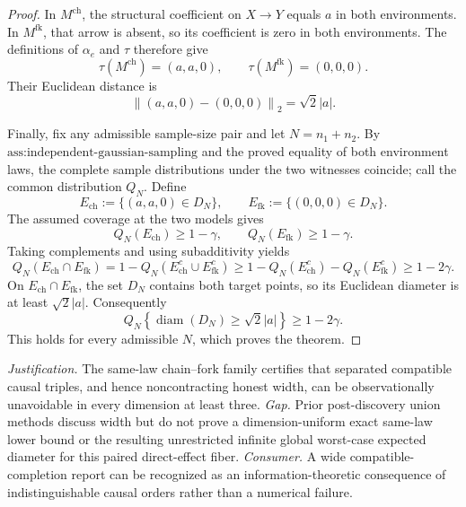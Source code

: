 \documentclass{article}
\begin{document}
\begin{proof}
In \(M^{\mathrm{ch}}\), the structural coefficient on \(X\to Y\) equals \(a\) in both environments. In \(M^{\mathrm{fk}}\), that arrow is absent, so its coefficient is zero in both environments. The definitions of \(\alpha_e\) and \(\tau\) therefore give
\[
 \tau(M^{\mathrm{ch}})=(a,a,0),
 \qquad
 \tau(M^{\mathrm{fk}})=(0,0,0).
\]
Their Euclidean distance is
\[
 \left\|(a,a,0)-(0,0,0)\right\|_2=\sqrt2\lvert a\rvert.
\]

Finally, fix any admissible sample-size pair and let \(N=n_1+n_2\). By \(\text{ass:independent-gaussian-sampling}\) and the proved equality of both environment laws, the complete sample distributions under the two witnesses coincide; call the common distribution \(Q_N\). Define
\[
 E_{\mathrm{ch}}:=\{(a,a,0)\in D_N\},
 \qquad
 E_{\mathrm{fk}}:=\{(0,0,0)\in D_N\}.
\]
The assumed coverage at the two models gives
\[
 Q_N(E_{\mathrm{ch}})\ge1-\gamma,
 \qquad
 Q_N(E_{\mathrm{fk}})\ge1-\gamma.
\]
Taking complements and using subadditivity yields
\[
 Q_N(E_{\mathrm{ch}}\cap E_{\mathrm{fk}})
 =1-Q_N(E_{\mathrm{ch}}^c\cup E_{\mathrm{fk}}^c)
 \ge1-Q_N(E_{\mathrm{ch}}^c)-Q_N(E_{\mathrm{fk}}^c)
 \ge1-2\gamma.
\]
On \(E_{\mathrm{ch}}\cap E_{\mathrm{fk}}\), the set \(D_N\) contains both target points, so its Euclidean diameter is at least \(\sqrt2\lvert a\rvert\). Consequently
\[
 Q_N\!\left\{\operatorname{diam}(D_N)\ge\sqrt2\lvert a\rvert\right\}
 \ge1-2\gamma.
\]
This holds for every admissible \(N\), which proves the theorem.
\end{proof}
\par\smallskip\noindent \textit{Justification.} The same-law chain--fork family certifies that separated compatible causal triples, and hence noncontracting honest width, can be observationally unavoidable in every dimension at least three. \textit{Gap.} Prior post-discovery union methods discuss width but do not prove a dimension-uniform exact same-law lower bound or the resulting unrestricted infinite global worst-case expected diameter for this paired direct-effect fiber. \textit{Consumer.} A wide compatible-completion report can be recognized as an information-theoretic consequence of indistinguishable causal orders rather than a numerical failure.
\end{document}
